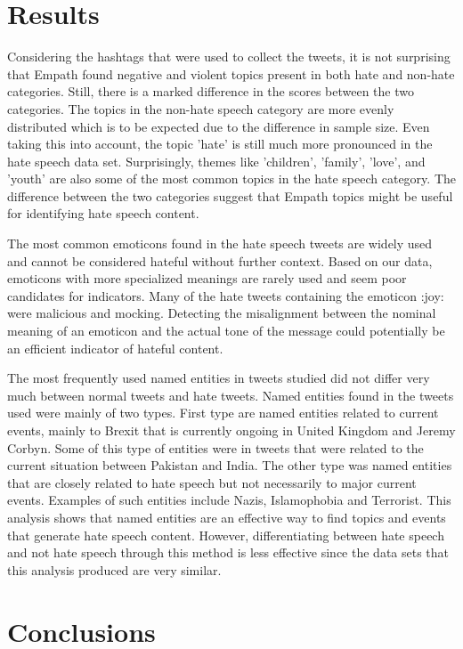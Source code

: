 \documentclass[conference]{IEEEtran}
\begin{document}
\section{Results}
Considering the hashtags that were used to collect the tweets, 
it is not surprising that Empath found negative and violent topics present 
in both hate and non-hate categories. Still, there is a marked difference in 
the scores between the two categories. The topics in the non-hate speech category 
are more evenly distributed which is to be expected due to the difference in sample size.
Even taking this into account, the topic 'hate' is still much more pronounced in the hate speech 
data set.  Surprisingly, themes like 'children', 'family', 'love', and 'youth' are also some of the 
most common topics in the hate speech category. The difference between the two categories suggest 
that Empath topics might be useful for identifying hate speech content.

The most common emoticons found in the hate speech tweets are widely used and cannot be considered hateful 
without further context. Based on our data, emoticons with more specialized meanings are rarely used and 
seem poor candidates for indicators. 
Many of the hate tweets containing the emoticon :joy: were malicious and mocking. 
Detecting the misalignment between the nominal meaning of an emoticon and the actual tone of the message could 
potentially be an efficient indicator of hateful content.

The most frequently used named entities in tweets studied did not differ very much between normal tweets and hate tweets. Named entities found in the tweets used were mainly of two types. First type are named entities related to current events, mainly to Brexit that is currently ongoing in United Kingdom and Jeremy Corbyn. Some of this type of entities were in tweets that were related to the current situation between Pakistan and India.
	The other type was named entities that are closely related to hate speech but not necessarily to major current events. Examples of such entities include Nazis, Islamophobia and Terrorist.
	This analysis shows that named entities are an effective way to find topics and events that generate hate speech content. However, differentiating between hate speech and not hate speech through this method is less effective since the data sets that this analysis produced are very similar.

\section{Conclusions}
\end{document}
